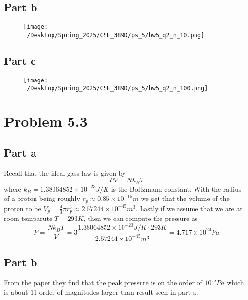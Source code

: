 \documentclass[12pt]{report}
\theoremstyle{custom}
\begin{document}
\subsection*{Part b}
\begin{figure}[H]
  \centering
  \texttt{[image: ~/Desktop/Spring\_2025/CSE\_389D/ps\_5/hw5\_q2\_n\_10.png]}
\end{figure}

% 

\subsection*{Part c}
\begin{figure}[H]
  \centering
  \texttt{[image: ~/Desktop/Spring\_2025/CSE\_389D/ps\_5/hw5\_q2\_n\_100.png]}
\end{figure}

% 

\section*{Problem 5.3}
\subsection*{Part a}
Recall that the ideal gass law is given by
\begin{equation*}
  PV = N k_B T
\end{equation*}
where $k_B = 1.38064852 \times 10^{-23} \si{J/K}$ is the Boltzmann constant. With the radius of a proton being roughly $r_p \approx 0.85 \times 10^{-15} \si{m}$ we get that the volume of the proton to be $V_p = \frac{4}{3} \pi r_p^3 \approx 2.57244 \times 10^{-45} \si{m^3}$. 
Lastly if we assume that we are at room temparute $T = 293\si{K}$, then we can compute the pressure as
\begin{equation*}
 P = \frac{N k_B T}{V} = 3\frac{1.38064852 \times 10^{-23} \si{J/K} \cdot 293 \si{K}}{2.57244 \times 10^{-45} \si{m^3}} = 4.717 \times 10^{24} \si{Pa}
\end{equation*}

\subsection*{Part b}
From the paper they find that the peak pressure is on the order of $10^{35} \si{Pa}$ which is about $11$ order of magnitudes larger than result seen in part a.
\end{document}
